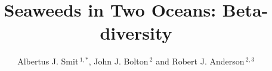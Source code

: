 \documentclass[utf8]{frontiersSCNS} %
\def\firstAuthorLast{Smit {et~al.}} %
\def\Authors{Albertus J. Smit\,$^{1,*}$, John J. Bolton\,$^{2}$ and Robert J. Anderson\,$^{2,3}$}
\begin{document}
\onecolumn
{}

\title[Seaweeds in Two Oceans]{Seaweeds in Two Oceans: Beta-diversity}

\author[\firstAuthorLast ]{\Authors} %
\address{} %
\correspondance{} %

\extraAuth{}%


\maketitle
\end{document}
